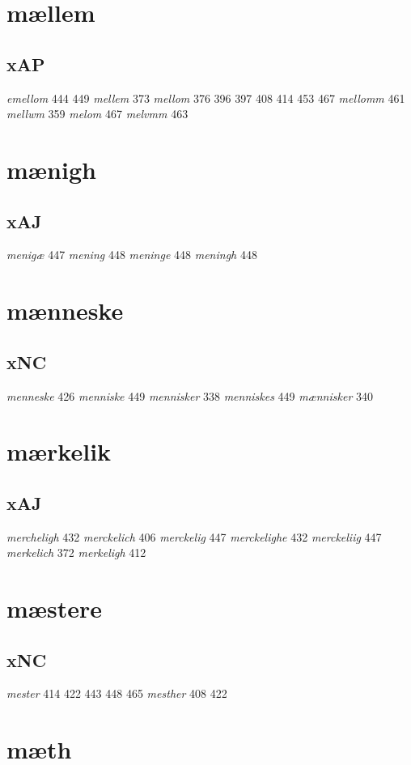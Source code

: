 \documentclass[a4paper,twocolumn]{article}
\begin{document}
\section{mællem}
\label{sec:org814828d}
\subsection{xAP}
\label{sec:org3749234}
\emph{emellom} 444 449 \emph{mellem} 373 \emph{mellom} 376 396 397 408 414 453 467 \emph{mellomm} 461 \emph{mellwm} 359 \emph{melom} 467 \emph{melvmm} 463 
\section{mænigh}
\label{sec:org9ff777b}
\subsection{xAJ}
\label{sec:org6be311d}
\emph{menigæ} 447 \emph{mening} 448 \emph{meninge} 448 \emph{meningh} 448 
\section{mænneske}
\label{sec:org71c68c1}
\subsection{xNC}
\label{sec:orgacf5ecc}
\emph{menneske} 426 \emph{menniske} 449 \emph{mennisker} 338 \emph{menniskes} 449 \emph{mænnisker} 340 
\section{mærkelik}
\label{sec:orga15b4fa}
\subsection{xAJ}
\label{sec:org02d0780}
\emph{mercheligh} 432 \emph{merckelich} 406 \emph{merckelig} 447 \emph{merckelighe} 432 \emph{merckeliig} 447 \emph{merkelich} 372 \emph{merkeligh} 412 
\section{mæstere}
\label{sec:orga39c0ec}
\subsection{xNC}
\label{sec:orgab336cc}
\emph{mester} 414 422 443 448 465 \emph{mesther} 408 422 
\section{mæth}
\label{sec:org8ef0e79}
\end{document}
